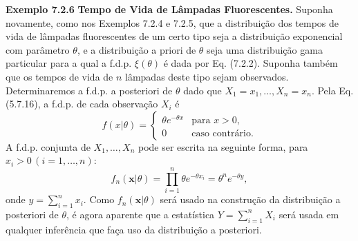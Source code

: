 \vspace{1cm}
\noindent\textbf{Exemplo 7.2.6} \quad \textbf{Tempo de Vida de Lâmpadas Fluorescentes.} Suponha novamente, como nos Exemplos 7.2.4 e 7.2.5, que a distribuição dos tempos de vida de lâmpadas fluorescentes de um certo tipo seja a distribuição exponencial com parâmetro $\theta$, e a distribuição a priori de $\theta$ seja uma distribuição gama particular para a qual a f.d.p. $\xi(\theta)$ é dada por Eq. (7.2.2). Suponha também que os tempos de vida de $n$ lâmpadas deste tipo sejam observados. Determinaremos a f.d.p. a posteriori de $\theta$ dado que $X_1=x_1, \dots, X_n=x_n$.
Pela Eq. (5.7.16), a f.d.p. de cada observação $X_i$ é
$$ f(x|\theta) = 
\begin{cases}
\theta e^{-\theta x} & \text{para } x > 0, \\
0 & \text{caso contrário.}
\end{cases}
$$
A f.d.p. conjunta de $X_1, \dots, X_n$ pode ser escrita na seguinte forma, para $x_i > 0 \, (i=1, \dots, n)$:
$$ f_n(\mathbf{x}|\theta) = \prod_{i=1}^{n} \theta e^{-\theta x_i} = \theta^n e^{-\theta y}, $$
onde $y = \sum_{i=1}^{n} x_i$. Como $f_n(\mathbf{x}|\theta)$ será usado na construção da distribuição a posteriori de $\theta$, é agora aparente que a estatística $Y=\sum_{i=1}^{n} X_i$ será usada em qualquer inferência que faça uso da distribuição a posteriori.

